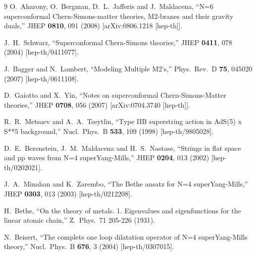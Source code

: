 \documentclass[a4paper]{article}
\numberwithin{equation}{section}
\begin{document}
\begin{thebibliography} {9}
  O.~Aharony, O.~Bergman, D.~L.~Jafferis and J.~Maldacena,
  ``N=6 superconformal Chern-Simons-matter theories, M2-branes and their gravity duals,''
  JHEP {\bf 0810}, 091 (2008)
  [arXiv:0806.1218 [hep-th]].
  
  J.~H.~Schwarz,
  ``Superconformal Chern-Simons theories,''
  JHEP {\bf 0411}, 078 (2004)
  [hep-th/0411077].
  
  J.~Bagger and N.~Lambert,
  ``Modeling Multiple M2's,''
  Phys.\ Rev.\ D {\bf 75}, 045020 (2007)
  [hep-th/0611108].
  
  D.~Gaiotto and X.~Yin,
  ``Notes on superconformal Chern-Simons-Matter theories,''
  JHEP {\bf 0708}, 056 (2007)
  [arXiv:0704.3740 [hep-th]].
  
  R.~R.~Metsaev and A.~A.~Tseytlin,
  ``Type IIB superstring action in AdS(5) x S**5 background,''
  Nucl.\ Phys.\ B {\bf 533}, 109 (1998)
  [hep-th/9805028].
  
  D.~E.~Berenstein, J.~M.~Maldacena and H.~S.~Nastase,
  ``Strings in flat space and pp waves from N=4 superYang-Mills,''
  JHEP {\bf 0204}, 013 (2002)
  [hep-th/0202021].
  
  J.~A.~Minahan and K.~Zarembo,
  ``The Bethe ansatz for N=4 superYang-Mills,''
  JHEP {\bf 0303}, 013 (2003)
  [hep-th/0212208].
  
  H.~Bethe, 
  ``On the theory of metals. 1. Eigenvalues and eigenfunctions for the linear atomic chain,''
  Z.\ Phys.\ 71 205-226 (1931).
  
  N.~Beisert,
  ``The complete one loop dilatation operator of N=4 superYang-Mills theory,''
  Nucl.\ Phys.\ B {\bf 676}, 3 (2004)
  [hep-th/0307015].
  

\end{thebibliography}
\end{document}
